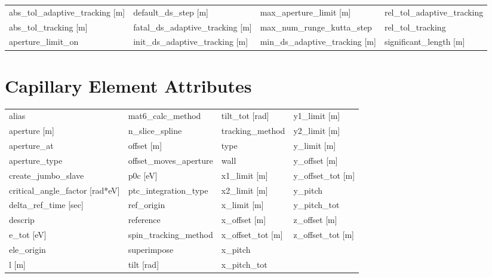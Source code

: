  \begin{tabular}{llll} \toprule
abs_tol_adaptive_tracking [m]    & default_ds_step [m]              & max_aperture_limit [m]           & rel_tol_adaptive_tracking        \\
abs_tol_tracking [m]             & fatal_ds_adaptive_tracking [m]   & max_num_runge_kutta_step         & rel_tol_tracking                 \\
aperture_limit_on                & init_ds_adaptive_tracking [m]    & min_ds_adaptive_tracking [m]     & significant_length [m]           \\
 \bottomrule
 \end{tabular}
 \vfill
 
 \section{Capillary Element Attributes}
 \label{s:list.capillary}
 
 \begin{tabular}{llll} \toprule
alias                            & mat6_calc_method                 & tilt_tot [rad]                   & y1_limit [m]                     \\
aperture [m]                     & n_slice_spline                   & tracking_method                  & y2_limit [m]                     \\
aperture_at                      & offset [m]                       & type                             & y_limit [m]                      \\
aperture_type                    & offset_moves_aperture            & wall                             & y_offset [m]                     \\
create_jumbo_slave               & p0c [eV]                         & x1_limit [m]                     & y_offset_tot [m]                 \\
critical_angle_factor [rad*eV]   & ptc_integration_type             & x2_limit [m]                     & y_pitch                          \\
delta_ref_time [sec]             & ref_origin                       & x_limit [m]                      & y_pitch_tot                      \\
descrip                          & reference                        & x_offset [m]                     & z_offset [m]                     \\
e_tot [eV]                       & spin_tracking_method             & x_offset_tot [m]                 & z_offset_tot [m]                 \\
ele_origin                       & superimpose                      & x_pitch                          &                                  \\
l [m]                            & tilt [rad]                       & x_pitch_tot                      &                                  \\
 \bottomrule
 \end{tabular}
 \vfill
 
